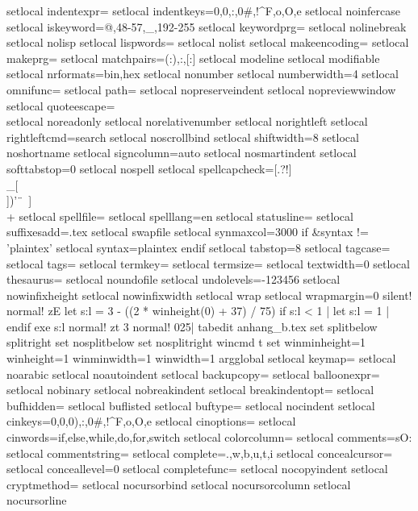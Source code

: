 {setlocal indentexpr=
setlocal indentkeys=0{,0},:,0#,!^F,o,O,e
setlocal noinfercase
setlocal iskeyword=@,48-57,_,192-255
setlocal keywordprg=
setlocal nolinebreak
setlocal nolisp
setlocal lispwords=
setlocal nolist
setlocal makeencoding=
setlocal makeprg=
setlocal matchpairs=(:),{:},[:]
setlocal modeline
setlocal modifiable
setlocal nrformats=bin,hex
setlocal nonumber
setlocal numberwidth=4
setlocal omnifunc=
setlocal path=
setlocal nopreserveindent
setlocal nopreviewwindow
setlocal quoteescape=\\
setlocal noreadonly
setlocal norelativenumber
setlocal norightleft
setlocal rightleftcmd=search
setlocal noscrollbind
setlocal shiftwidth=8
setlocal noshortname
setlocal signcolumn=auto
setlocal nosmartindent
setlocal softtabstop=0
setlocal nospell
setlocal spellcapcheck=[.?!]\\_[\\])'\"\	\ ]\\+
setlocal spellfile=
setlocal spelllang=en
setlocal statusline=
setlocal suffixesadd=.tex
setlocal swapfile
setlocal synmaxcol=3000
if &syntax != 'plaintex'
setlocal syntax=plaintex
endif
setlocal tabstop=8
setlocal tagcase=
setlocal tags=
setlocal termkey=
setlocal termsize=
setlocal textwidth=0
setlocal thesaurus=
setlocal noundofile
setlocal undolevels=-123456
setlocal nowinfixheight
setlocal nowinfixwidth
setlocal wrap
setlocal wrapmargin=0
silent! normal! zE
let s:l = 3 - ((2 * winheight(0) + 37) / 75)
if s:l < 1 | let s:l = 1 | endif
exe s:l
normal! zt
3
normal! 025|
tabedit anhang_b.tex
set splitbelow splitright
set nosplitbelow
set nosplitright
wincmd t
set winminheight=1 winheight=1 winminwidth=1 winwidth=1
argglobal
setlocal keymap=
setlocal noarabic
setlocal noautoindent
setlocal backupcopy=
setlocal balloonexpr=
setlocal nobinary
setlocal nobreakindent
setlocal breakindentopt=
setlocal bufhidden=
setlocal buflisted
setlocal buftype=
setlocal nocindent
setlocal cinkeys=0{,0},0),:,0#,!^F,o,O,e
setlocal cinoptions=
setlocal cinwords=if,else,while,do,for,switch
setlocal colorcolumn=
setlocal comments=sO:%
setlocal commentstring=%
setlocal complete=.,w,b,u,t,i
setlocal concealcursor=
setlocal conceallevel=0
setlocal completefunc=
setlocal nocopyindent
setlocal cryptmethod=
setlocal nocursorbind
setlocal nocursorcolumn
setlocal nocursorline
}
